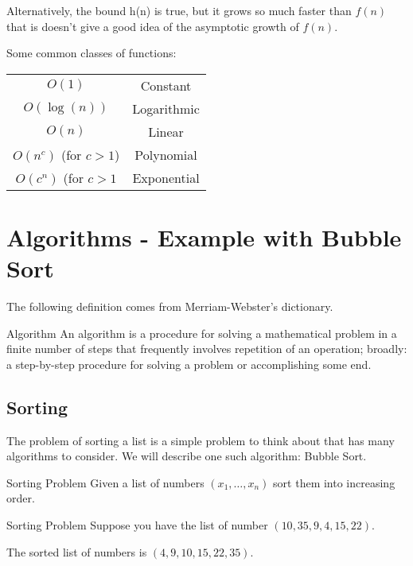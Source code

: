 Alternatively, the bound h(n) is true, but it grows so much faster than $f(n)$ that is doesn't give a good idea of the asymptotic growth of $f(n)$.




Some common classes of functions:
\begin{center}
\begin{tabular}{|c|c|}
\hline
$O(1)$ & Constant\\
$O(\log(n))$ & Logarithmic\\
$O(n)$ & Linear\\
$O(n^c)$ (for $c > 1$) & Polynomial\\
$O(c^n)$  (for $c > 1$ & Exponential\\
\hline
\end{tabular}
\end{center}
\begin{center}
\end{center}
\section{Algorithms - Example with Bubble Sort}
The following definition comes from Merriam-Webster's dictionary.
\begin{definition}{Algorithm}{}
An algorithm is a procedure for solving a mathematical problem in a finite number of steps that frequently involves repetition of an operation; broadly: a step-by-step procedure for solving a problem or accomplishing some end.
\end{definition}
\subsection{Sorting }


The problem of sorting a list is a simple problem to think about that has many algorithms to consider.  We will describe one such algorithm: Bubble Sort. 

\begin{general}{Sorting Problem}{\polynomial}{}
Given a list of numbers $(x_1, \dots, x_n)$ sort them into increasing order.  
\end{general}

\begin{example}{Sorting Problem}{}
Suppose you have the list of number $(10, 35, 9, 4, 15, 22)$.

The sorted list of numbers is $(4,9,10,15,22,35)$.
\end{example}

